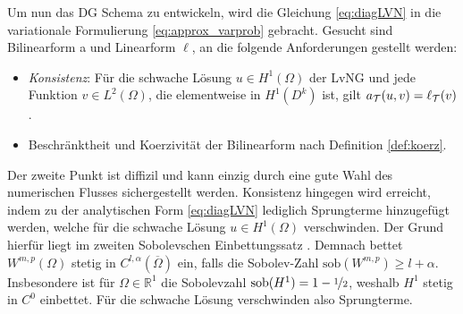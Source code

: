 Um nun das DG Schema zu entwickeln, wird die Gleichung \eqref{eq:diagLVN} in die variationale Formulierung \eqref{eq:approx_varprob} gebracht. Gesucht sind Bilinearform a und Linearform $\ell$, an die folgende Anforderungen gestellt werden:
\begin{itemize}
  \item \emph{Konsistenz}: Für die schwache Lösung $u\in H^1(\Omega)$ der LvNG und jede Funktion $v\in L^2(\Omega)$, die elementweise in $H^1(D^k)$ ist, gilt ${a_{\mathcal{T}}(u,v)=\ell_{\mathcal{T}}(v)}$.
  \item Beschränktheit und Koerzivität der Bilinearform nach Definition \ref{def:koerz}.
\end{itemize}
Der zweite Punkt ist diffizil und kann einzig durch eine gute Wahl des numerischen Flusses sichergestellt werden.
Konsistenz hingegen wird erreicht, indem zu der analytischen Form \eqref{eq:diagLVN} lediglich Sprungterme hinzugefügt werden, welche für die schwache Lösung $u\in H^1(\Omega)$ verschwinden. Der Grund hierfür liegt im zweiten Sobolevschen Einbettungssatz \cite{buchPietro}. Demnach bettet $W^{m,p}(\Omega)$ stetig in $C^{l,\alpha}(\overline{\Omega})$ ein, falls die Sobolev-Zahl ${\text{sob}(W^{m,p})\geq l+\alpha}$.
Insbesondere ist für $\Omega\in\mathbb{R}^1$ die Sobolevzahl $\text{sob}(H^1) = 1-\nicefrac{1}{2}$, weshalb $H^1$ stetig in $C^0$ einbettet. Für die schwache Lösung verschwinden also Sprungterme.

